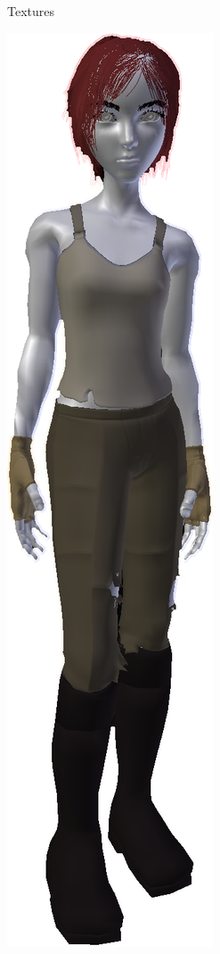 \documentclass[compress]{beamer}
\begin{document}

\begin{frame}{Textures}
    \begin{center}
        \includegraphics[width=0.3\linewidth]{sintel-opengl-transparent}

\end{center}
\end{frame}
\end{document}
